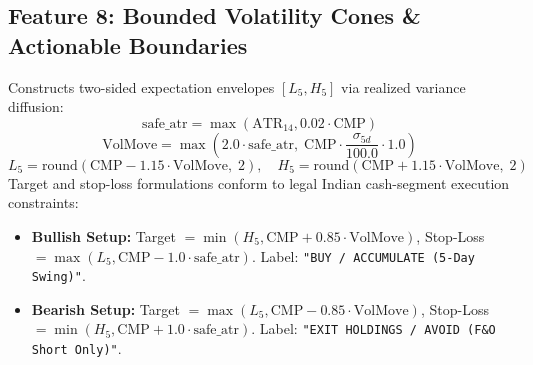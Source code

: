 \documentclass[11pt,a4paper]{article}
\begin{document}
\subsection{Feature 8: Bounded Volatility Cones \& Actionable Boundaries}
Constructs two-sided expectation envelopes $[L_5, H_5]$ via realized variance diffusion:
\begin{equation}
\text{safe\_atr} = \max(\text{ATR}_{14}, 0.02 \cdot \text{CMP})
\end{equation}
\begin{equation}
\text{VolMove} = \max\left(2.0 \cdot \text{safe\_atr},\; \text{CMP} \cdot \frac{\sigma_{5d}}{100.0} \cdot 1.0\right)
\end{equation}
\begin{equation}
L_5 = \text{round}(\text{CMP} - 1.15 \cdot \text{VolMove},\; 2), \quad H_5 = \text{round}(\text{CMP} + 1.15 \cdot \text{VolMove},\; 2)
\end{equation}
Target and stop-loss formulations conform to legal Indian cash-segment execution constraints:
\begin{itemize}[leftmargin=*]
    \item \textbf{Bullish Setup:} Target $= \min(H_5, \text{CMP} + 0.85 \cdot \text{VolMove})$, Stop-Loss $= \max(L_5, \text{CMP} - 1.0 \cdot \text{safe\_atr})$. Label: \texttt{"BUY / ACCUMULATE (5-Day Swing)"}.
    \item \textbf{Bearish Setup:} Target $= \max(L_5, \text{CMP} - 0.85 \cdot \text{VolMove})$, Stop-Loss $= \min(H_5, \text{CMP} + 1.0 \cdot \text{safe\_atr})$. Label: \texttt{"EXIT HOLDINGS / AVOID (F\&O Short Only)"}.
\end{itemize}
\end{document}
